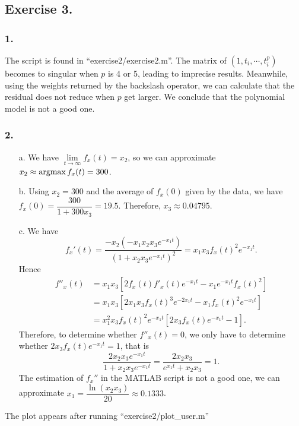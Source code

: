 \subsection*{Exercise 3.}

\subsubsection*{1.} The script is found in ``exercise2/exercise2.m''. The matrix of $(1,t_i,\cdots,t_i^p)$ becomes to singular when $p$ is 4 or 5, leading to imprecise results. Meanwhile, using the weights returned by the backslash operator, we can calculate that the residual does not reduce when $p$ get larger. We conclude that the polynomial model is not a good one.

\subsubsection*{2.}

\begin{enumerate}
  \item[a.] We have $\lim\limits_{t\to\infty} f_x(t) = x_2$, so we can approximate $x_2 \approx \operatorname*{argmax} f_x(t) = 300$.
  \item[b.] Using $x_2 = 300$ and the average of $f_x(0)$ given by the data, we have $f_x(0) = \dfrac{300}{1+300x_3} = 19.5$. Therefore, $x_3 \approx 0.04795$.
  \item[c.]
        We have
        $$f_x'(t) = \dfrac{-x_2(-x_1x_2x_3e^{-x_1t})}{(1+x_2x_3e^{-x_1t})^2} = x_1x_3f_x(t)^2e^{-x_1t}.$$
        Hence
        \begin{align*}
          f''_x(t)
           & = x_1x_3\left[2f_x(t)f'_x(t)e^{-x_1t}-x_1e^{-x_1t}f_x(t)^2\right]   \\
           & = x_1x_3\left[2x_1x_3f_x(t)^3e^{-2x_1t}-x_1f_x(t)^2e^{-x_1t}\right] \\
           & = x_1^2x_3f_x(t)^2e^{-x_1t}\left[2x_3f_x(t)e^{-x_1t}-1\right].
        \end{align*}
        Therefore, to determine whether $f''_x(t)=0$, we only have to determine whether $2x_3f_x(t)e^{-x_1t}=1$, that is
        $$\dfrac{2x_2x_3 e^{-x_1t}}{1+x_2x_3e^{-x_1t}} = \dfrac{2x_2x_3}{e^{x_1t}+x_2x_3} = 1.$$
        The estimation of $f_x''$ in the MATLAB script is not a good one, we can approximate $x_1=\dfrac{\ln(x_2x_3)}{20} \approx 0.1333$.
\end{enumerate}

The plot appears after running  ``exercise2/plot\_user.m''
